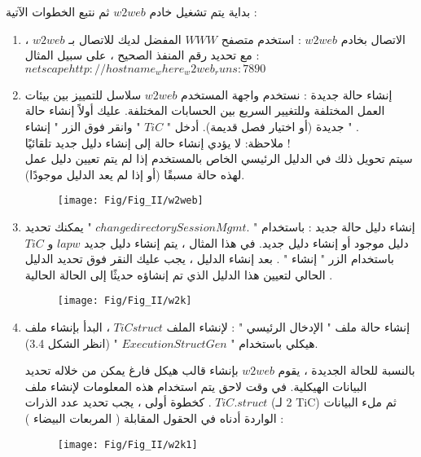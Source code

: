 بداية يتم تشغيل خادم $ w2web $ ثم نتبع الخطوات الآتية :
\begin{enumerate}
	\item 
	الاتصال بخادم $ w2web $ : استخدم متصفح $ WWW $ المفضل لديك للاتصال بـ $ w2web $ ، مع تحديد رقم المنفذ الصحيح ، على سبيل المثال : \\
	$ netscape http://hostname_where_w2web_runs:7890 $
	
	\item 
	إنشاء حالة جديدة : نستخدم واجهة المستخدم $ w2web $ سلاسل للتمييز بين بيئات العمل المختلفة وللتغيير السريع بين الحسابات المختلفة. عليك أولاً إنشاء حالة جديدة  (أو اختيار فصل قديمة). أدخل " $ TiC $ " وانقر فوق الزر "  إنشاء " .\\
	ملاحظة: لا يؤدي إنشاء حالة إلى إنشاء دليل جديد تلقائيًا !	\\
	سيتم تحويل ذلك في الدليل الرئيسي الخاص بالمستخدم إذا لم يتم تعيين دليل عمل لهذه حالة مسبقًا (أو إذا لم يعد الدليل موجودًا).
	
	\begin{figure}[h!]
		\centering
		\texttt{[image: Fig/Fig\_II/w2web]}
		\caption{}
		\label{fig:w2web}
	\end{figure}
	\FloatBarrier
	
	\item 
	إنشاء دليل حالة جديد : باستخدام "  $ change directory Session Mgmt. $  " يمكنك تحديد دليل موجود أو إنشاء دليل جديد. في هذا المثال ، يتم إنشاء دليل جديد $ lapw $ و $ TiC  $ باستخدام الزر " إنشاء " . بعد إنشاء الدليل ، يجب عليك النقر فوق تحديد الدليل الحالي لتعيين هذا الدليل الذي تم إنشاؤه حديثًا إلى الحالة الحالية .
	
	\begin{figure}[h!]
		\centering
		\texttt{[image: Fig/Fig\_II/w2k]}
		\caption{}
		\label{fig:w2k}
	\end{figure}
	\FloatBarrier
	
	\item 
	إنشاء حالة ملف " الإدخال الرئيسي " : لإنشاء الملف $ TiCstruct $ ، البدأ بإنشاء ملف هيكلي باستخدام " $ Execution StructGen $ "   (انظر الشكل 3.4).
	
	بالنسبة للحالة الجديدة ، يقوم $ w2web $ بإنشاء قالب هيكل فارغ يمكن من خلاله تحديد البيانات الهيكلية. في وقت لاحق يتم استخدام هذه المعلومات لإنشاء ملف $ TiC.struct $ . كخطوة أولى ، يجب تحديد عدد الذرات (2 لـ TiC) ثم ملء البيانات الواردة أدناه في الحقول المقابلة ( المربعات البيضاء ) :
	
	\begin{figure}[h!]
		\centering
		\texttt{[image: Fig/Fig\_II/w2k1]}
		\caption{}
		\label{fig:w2k1}
	\end{figure}
	\FloatBarrier
	

\end{enumerate}
